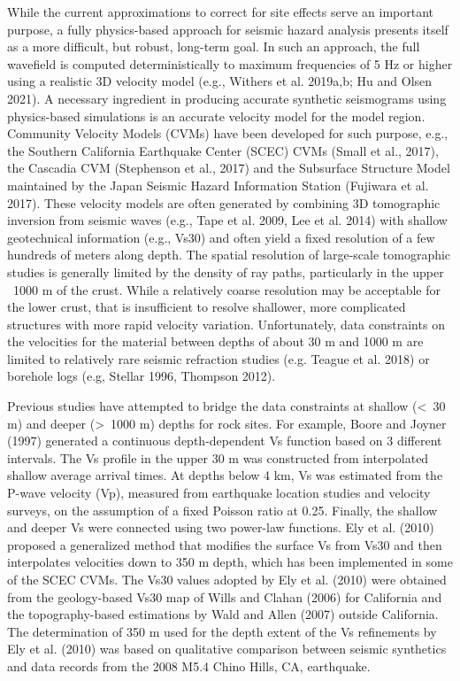 While the current approximations to correct for site effects serve an important purpose, a fully physics-based approach for seismic hazard analysis presents itself as a more difficult, but robust, long-term goal. In such an approach, the full wavefield is computed deterministically to maximum frequencies of 5 Hz or higher using a realistic 3D velocity model (e.g., Withers et al. 2019a,b; Hu and Olsen 2021). A necessary ingredient in producing accurate synthetic seismograms using physics-based simulations is an accurate velocity model for the model region. Community Velocity Models (CVMs) have been developed for such purpose, e.g., the Southern California Earthquake Center (SCEC) CVMs (Small et al., 2017), the Cascadia CVM (Stephenson et al., 2017) and the Subsurface Structure Model maintained by the Japan Seismic Hazard Information Station (Fujiwara et al. 2017). These velocity models are often generated by combining 3D tomographic inversion from seismic waves (e.g., Tape et al. 2009,  Lee et al. 2014) with shallow geotechnical information (e.g., Vs30) and often yield a fixed resolution of a few hundreds of meters along depth. The spatial resolution of large-scale tomographic studies is generally limited by the density of ray paths, particularly in the upper ~1000 m of the crust. While a relatively coarse resolution may be acceptable for the lower crust, that is insufficient to resolve shallower, more complicated structures with more rapid velocity variation. Unfortunately, data constraints on the velocities for the material between depths of about 30 m and 1000 m are limited to relatively rare seismic refraction studies (e.g. Teague et al. 2018) or borehole logs (e.g, Stellar 1996, Thompson  2012).

Previous studies have attempted to bridge the data constraints at shallow (<~30 m) and deeper (>~1000 m) depths for rock sites. For example, Boore and Joyner (1997) generated a continuous depth-dependent Vs function based on 3 different intervals. The Vs profile in the upper 30 m was constructed from interpolated shallow average arrival times. At depths below 4 km, Vs was estimated from the P-wave velocity (Vp), measured from earthquake location studies and velocity surveys, on the assumption of a fixed Poisson ratio at 0.25. Finally, the shallow and deeper Vs were connected using two power-law functions.  Ely et al. (2010) proposed a generalized method that modifies the surface Vs from Vs30 and then interpolates velocities down to 350 m depth, which has been implemented in some of the SCEC CVMs. The Vs30 values adopted by Ely et al. (2010) were obtained from the geology-based Vs30 map of Wills and Clahan (2006) for California and the topography-based estimations by Wald and Allen (2007) outside California. The determination of  350 m used for the depth extent of the Vs refinements by Ely et al. (2010) was based on qualitative comparison between seismic synthetics and data records from the 2008 M5.4 Chino Hills, CA, earthquake.

